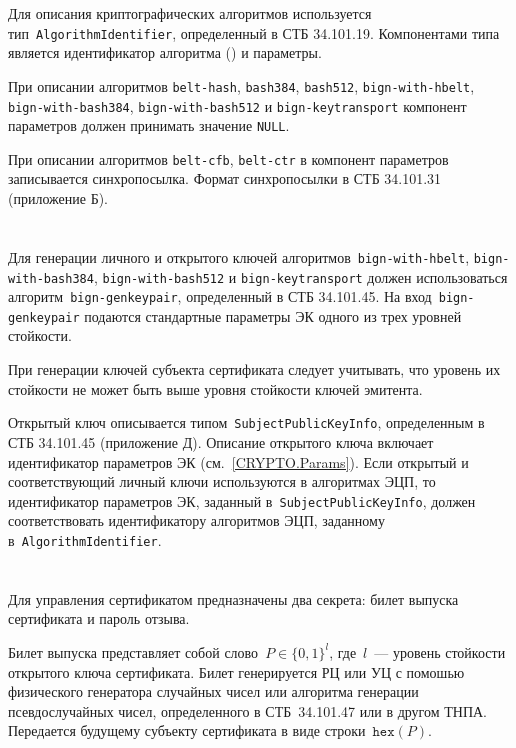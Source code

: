 Для описания криптографических алгоритмов используется 
тип~\texttt{AlgorithmIdentifier}, определенный в СТБ 34.101.19.
Компонентами типа является идентификатор алгоритма () и  параметры. 

При описании алгоритмов 
\texttt{belt-hash}, \texttt{bash384}, \texttt{bash512},
\texttt{bign-with-hbelt}, \texttt{bign-with-bash384}, 
\texttt{bign-with-bash512} и \texttt{bign-keytransport} компонент параметров 
должен принимать значение \texttt{NULL}.

При описании алгоритмов \texttt{belt-cfb}, \texttt{belt-ctr}
в компонент параметров записывается синхропосылка.
Формат синхропосылки  в СТБ 34.101.31 (приложение Б).

\section{}\label{CRYPTO.Keypair}

Для генерации личного и открытого ключей алгоритмов~\texttt{bign-with-hbelt}, 
\texttt{bign-with-bash384}, \texttt{bign-with-bash512} и 
\texttt{bign-keytransport} должен использоваться 
алгоритм~\texttt{bign-genkeypair}, определенный в СТБ 34.101.45. 
%
На вход~\texttt{bign-genkeypair} подаются стандартные параметры ЭК одного 
из трех уровней стойкости. 

При генерации ключей субъекта сертификата следует учитывать, что 
уровень их стойкости не может быть выше уровня стойкости ключей эмитента.

Открытый ключ описывается типом~\texttt{SubjectPublicKeyInfo}, 
определенным в СТБ 34.101.45 (приложение Д).
%
Описание открытого ключа включает идентификатор параметров ЭК 
(см.~\ref{CRYPTO.Params}). 
%
Если открытый и соответствующий личный ключи используются в алгоритмах 
ЭЦП, то идентификатор параметров ЭК, заданный в~\texttt{SubjectPublicKeyInfo},
должен соответствовать идентификатору алгоритмов ЭЦП, заданному 
в~\texttt{AlgorithmIdentifier}.

\section{}\label{CRYPTO.Pwd}

Для управления сертификатом предназначены два секрета:
билет выпуска сертификата и пароль отзыва. 

Билет выпуска представляет собой слово~$P\in\{0,1\}^l$,
где~$l$~--- уровень стойкости открытого ключа сертификата.
%
Билет генерируется РЦ или УЦ с помошью физического генератора 
случайных чисел или алгоритма генерации псевдослучайных чисел, 
определенного в СТБ~34.101.47 или в другом ТНПА. 
%
Передается будущему субъекту сертификата в виде строки~$\texttt{hex}(P)$. 

